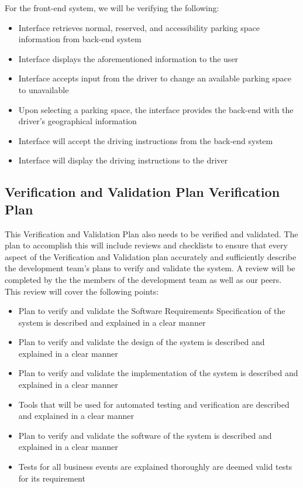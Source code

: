 \documentclass[12pt, titlepage]{article}
\begin{document}
For the front-end system, we will be verifying the following:
\begin{itemize}
    \item Interface retrieves normal, reserved, and accessibility parking space
    information from back-end system
    \item Interface displays the aforementioned information to the user
    \item Interface accepts input from the driver to change an available parking
    space to unavailable
    \item Upon selecting a parking space, the interface provides the back-end
    with the driver's geographical information
    \item Interface will accept the driving instructions from the back-end
    system
    \item Interface will display the driving instructions to the driver
\end{itemize}

\subsection{Verification and Validation Plan Verification Plan}
\label{sec:vnv}




This Verification and Validation Plan also needs to be verified and validated.
The plan to accomplish this will include reviews and checklists to ensure that
every aspect of the Verification and Validation plan accurately and sufficiently
describe the development team's plans to verify and validate the system. A
review will be completed by the the members of the development team as well as
our peers. This review will cover the following points:
\begin{itemize}
    \item Plan to verify and validate the Software Requirements Specification of
    the system is described and explained in a clear manner
    \item Plan to verify and validate the design of the system is described and
    explained in a clear manner
    \item Plan to verify and validate the implementation of the system is
    described and explained in a clear manner
    \item Tools that will be used for automated testing and verification are
    described and explained in a clear manner
    \item Plan to verify and validate the software of the system is described
    and explained in a clear manner
    \item Tests for all business events are explained thoroughly are deemed
    valid tests for its requirement
\end{itemize}
\end{document}
